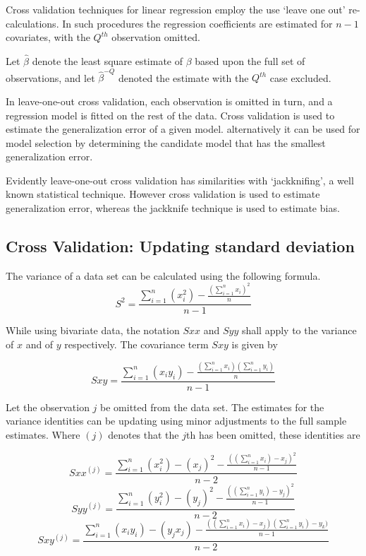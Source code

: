 \documentclass[12pt, a4paper]{report}
\theoremstyle{plain}
\theoremstyle{definition}
\theoremstyle{remark}
\begin{document}
Cross validation techniques for linear regression employ the use `leave one out' re-calculations. In such procedures the regression coefficients are estimated for $n-1$ covariates, with the $Q^{th}$ observation omitted.

Let $\hat{\beta}$ denote the least square estimate of $\beta$ based upon the full set of observations, and let
$\hat{\beta}^{-Q}$ denoted the estimate with the $Q^{th}$ case
excluded.


In leave-one-out cross validation, each observation is omitted in turn, and a regression model is fitted on the rest of the data. Cross validation is used to estimate the generalization error of a given model. alternatively it can be used for model selection by determining the candidate model that has the smallest generalization error.


Evidently leave-one-out cross validation has similarities with `jackknifing', a well known statistical technique. However cross validation is used to estimate generalization error, whereas the jackknife technique is used to estimate bias.

\subsection{Cross Validation: Updating standard deviation} %

The variance of a data set can be calculated using the following formula.
\begin{equation}
S^{2}=\frac{\sum_{i=1}^{n}(x_{i}^{2})-\frac{(\sum_{i=1}^{n}x_{i})^{2}}{n}}{n-1}
\end{equation}

While using bivariate data, the notation $Sxx$ and $Syy$ shall apply to the variance of $x$ and of $y$ respectively. The covariance term $Sxy$ is given by

\begin{equation}
Sxy=\frac{\sum_{i=1}^{n}(x_{i}y_{i})-\frac{(\sum_{i=1}^{n}x_{i})(\sum_{i=1}^{n}y_{i})}{n}}{n-1}
\end{equation}

Let the observation $j$ be omitted from the data set. The estimates for the variance identities can be updating using minor adjustments to the full sample estimates. Where $(j)$ denotes that the $j$th has been omitted, these identities are

\begin{equation}
Sxx^{(j)}=\frac{\sum_{i=1}^{n}(x_{i}^{2})-(x_{j})^{2}-\frac{((\sum_{i=1}^{n}x_{i})-x_{j})^{2}}{n-1}}{n-2}
\end{equation}
\begin{equation}
Syy^{(j)}=\frac{\sum_{i=1}^{n}(y_{i}^{2})-(y_{j})^{2}-\frac{((\sum_{i=1}^{n}y_{i})-y_{j})^{2}}{n-1}}{n-2}
\end{equation}
\begin{equation}
Sxy^{(j)}=\frac{\sum_{i=1}^{n}(x_{i}y_{i})-(y_{j}x_{j})-\frac{((\sum_{i=1}^{n}x_{i})-x_{j})(\sum_{i=1}^{n}y_{i})-y_{k})}{n-1}}{n-2}
\end{equation}
\end{document}
